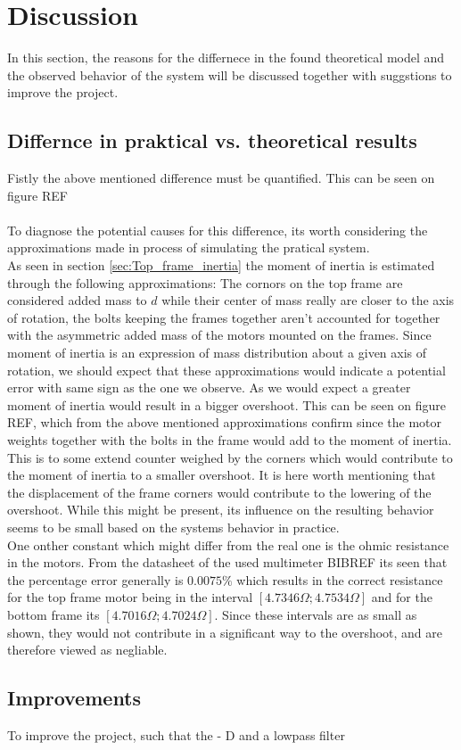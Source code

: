 \documentclass[../../main]{subfiles}
\begin{document}
\section{Discussion}
\label{sec:discussion}
In this section, the reasons for the differnece in the found theoretical model and the observed behavior of the system will be discussed together with suggstions to improve the project.
\subsection{Differnce in praktical vs. theoretical results}
Fistly the above mentioned difference must be quantified. This can be seen on figure REF\\
\\
To diagnose the potential causes for this difference, its worth considering the approximations made in process of simulating the pratical system.\\
As seen in section \ref{sec:Top_frame_inertia} the moment of inertia is estimated through the following approximations: The cornors on the top frame are considered added mass to $d$ while their center of mass really are closer to the axis of rotation, the bolts keeping the frames together aren't accounted for together with the asymmetric added mass of the motors mounted on the frames. Since moment of inertia is an expression of mass distribution about a given axis of rotation, we should expect that these approximations would indicate a potential error with same sign as the one we observe. As we would expect a greater moment of inertia would result in a bigger overshoot. This can be seen on figure REF, which from the above mentioned approximations confirm since the motor weights together with the bolts in the frame would add to the moment of inertia. This is to some extend counter weighed by the corners which would contribute to the moment of inertia to a smaller overshoot. It is here worth mentioning that the displacement of the frame corners would contribute to the lowering of the overshoot. While this might be present, its influence on the resulting behavior seems to be small based on the systems behavior in practice.\\
One onther constant which might differ from the real one is the ohmic resistance in the motors. From the datasheet of the used multimeter BIBREF its seen that the percentage error generally is $0.0075\%$ which results in the correct resistance for the top frame motor being in the interval $[4.7346\Omega;4.7534\Omega]$ and for the bottom frame its $[4.7016\Omega;4.7024\Omega]$. Since these intervals are as small as shown, they would not contribute in a significant way to the overshoot, and are therefore viewed as negliable.\\
\subsection{Improvements}
To improve the project, such that the
- D and a lowpass filter
\end{document}
